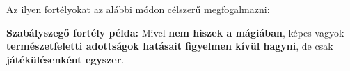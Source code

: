Az ilyen fortélyokat az alábbi módon célszerű megfogalmazni:


\textbf{Szabályszegő fortély példa:} Mivel \textbf{nem hiszek a mágiában}, képes vagyok \textbf{természetfeletti adottságok hatásait figyelmen kívül hagyni}, de csak \textbf{játékülésenként egyszer}.
